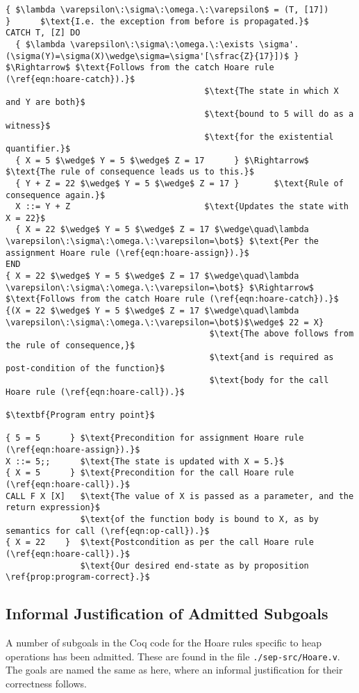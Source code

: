 \begin{lstlisting}[mathescape=true,keepspaces=true,label=lst:hoare_ex_asgn,caption=Decorated variant of the program from listing \ref{lst:imp-plus-ex}.]
  { $\lambda \varepsilon\:\sigma\:\omega.\:\varepsilon$ = (T, [17])          }      $\text{I.e. the exception from before is propagated.}$
CATCH T, [Z] DO
  { $\lambda \varepsilon\:\sigma\:\omega.\:\exists \sigma'.(\sigma(Y)=\sigma(X)\wedge\sigma=\sigma'[\sfrac{Z}{17}])$ } $\Rightarrow$ $\text{Follows from the catch Hoare rule (\ref{eqn:hoare-catch}).}$
                                        $\text{The state in which X and Y are both}$
                                        $\text{bound to 5 will do as a witness}$
                                        $\text{for the existential quantifier.}$
  { X = 5 $\wedge$ Y = 5 $\wedge$ Z = 17      } $\Rightarrow$    $\text{The rule of consequence leads us to this.}$
  { Y + Z = 22 $\wedge$ Y = 5 $\wedge$ Z = 17 }       $\text{Rule of consequence again.}$
  X ::= Y + Z                           $\text{Updates the state with X = 22}$
  { X = 22 $\wedge$ Y = 5 $\wedge$ Z = 17 $\wedge\quad\lambda \varepsilon\:\sigma\:\omega.\:\varepsilon=\bot$} $\text{Per the assignment Hoare rule (\ref{eqn:hoare-assign}).}$
END
{ X = 22 $\wedge$ Y = 5 $\wedge$ Z = 17 $\wedge\quad\lambda \varepsilon\:\sigma\:\omega.\:\varepsilon=\bot$} $\Rightarrow$ $\text{Follows from the catch Hoare rule (\ref{eqn:hoare-catch}).}$
{(X = 22 $\wedge$ Y = 5 $\wedge$ Z = 17 $\wedge\quad\lambda \varepsilon\:\sigma\:\omega.\:\varepsilon=\bot$)$\wedge$ 22 = X}
                                         $\text{The above follows from the rule of consequence,}$
                                         $\text{and is required as post-condition of the function}$
                                         $\text{body for the call Hoare rule (\ref{eqn:hoare-call}).}$

$\textbf{Program entry point}$

{ 5 = 5      } $\text{Precondition for assignment Hoare rule (\ref{eqn:hoare-assign}).}$
X ::= 5;;      $\text{The state is updated with X = 5.}$
{ X = 5      } $\text{Precondition for the call Hoare rule (\ref{eqn:hoare-call}).}$
CALL F X [X]   $\text{The value of X is passed as a parameter, and the return expression}$
               $\text{of the function body is bound to X, as by semantics for call (\ref{eqn:op-call}).}$
{ X = 22    }  $\text{Postcondition as per the call Hoare rule (\ref{eqn:hoare-call}).}$
               $\text{Our desired end-state as by proposition \ref{prop:program-correct}.}$
\end{lstlisting}

\subsection{Informal Justification of Admitted Subgoals}
A number of subgoals in the Coq code for the Hoare rules specific to heap operations has been admitted. These are found in the file \verb|./sep-src/Hoare.v|. The goals are named the same as here, where an informal justification for their correctness follows.

